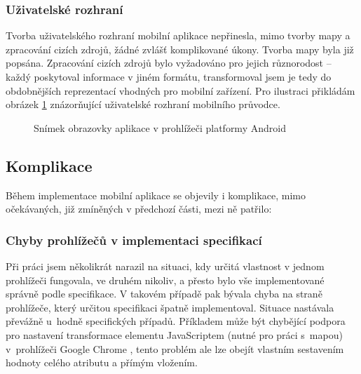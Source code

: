 \subsubsection{Uživatelské rozhraní}
Tvorba uživatelského rozhraní mobilní aplikace nepřinesla, mimo tvorby mapy a zpracování cizích zdrojů, žádné zvlášť komplikované úkony. Tvorba mapy byla již popsána. Zpracování cizích zdrojů bylo vyžadováno pro jejich různorodost -- každý poskytoval informace v jiném formátu, transformoval jsem je tedy do obdobnějších reprezentací vhodných pro mobilní zařízení. Pro ilustraci přikládám obrázek \ref{fig:mobil:android:pruvodce} znázorňující uživatelské rozhraní mobilního průvodce.
\begin{figure}[h]
 \centering
 \setlength\fboxsep{0pt}
 \setlength\fboxrule{0.5pt}
 \caption{Snímek obrazovky aplikace v prohlížeči platformy Android}
 \label{fig:mobil:android:pruvodce}
\end{figure}



\subsection{Komplikace}
Během implementace mobilní aplikace se objevily i komplikace, mimo očekávaných, již zmíněných v předchozí části, mezi ně patřilo:

\subsubsection{Chyby prohlížečů v implementaci specifikací}
Při práci jsem několikrát narazil na situaci, kdy určitá vlastnost v jednom prohlížeči fungovala, ve druhém nikoliv, a přesto bylo vše implementované správně podle specifikace. V takovém případě pak bývala chyba na straně prohlížeče, který určitou specifikaci špatně implementoval. Situace nastávala převážně u~hodně specifických případů. Příkladem může být chybějící podpora pro nastavení transformace  elementu JavaScriptem (nutné pro práci s~mapou) v~prohlížeči Google Chrome \cite{BugChromeTran}, tento problém ale lze obejít vlastním sestavením hodnoty celého atributu a přímým vložením. 

